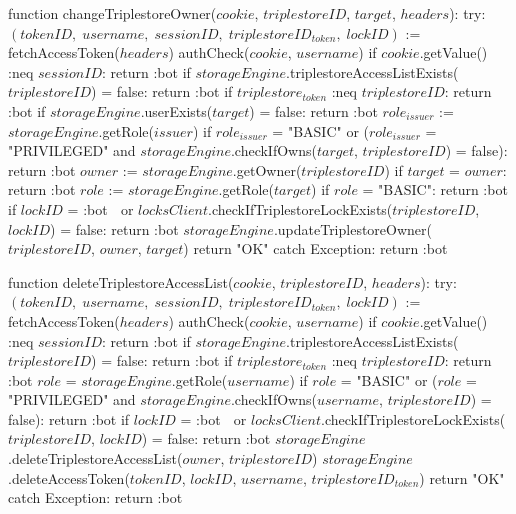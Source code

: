 function changeTriplestoreOwner($cookie$, $triplestoreID$, $target$, $headers$):
    try:
        $(tokenID, \; username, \; sessionID, \; triplestoreID_{token}, \; lockID)$ := fetchAccessToken($headers$)
        authCheck($cookie$, $username$)
        if $cookie$.getValue() :neq $sessionID$: 
            return :bot
        if $storageEngine$.triplestoreAccessListExists($triplestoreID$) = false:
            return :bot
        if $triplestore_{token}$ :neq $triplestoreID$:
            return :bot
        if $storageEngine$.userExists($target$) = false:
            return :bot
        $role_{issuer}$ := $storageEngine$.getRole($issuer$)
        if $role_{issuer}$ = "BASIC" or ($role_{issuer}$ = "PRIVILEGED" and $storageEngine$.checkIfOwns($target$, $triplestoreID$) = false):
            return :bot
        $owner$ := $storageEngine$.getOwner($triplestoreID$)
        if $target$ = $owner$:
            return :bot
        $role$ := $storageEngine$.getRole($target$)
        if $role$ = "BASIC":
            return :bot
        if $lockID$ = :bot $\;$ or $locksClient$.checkIfTriplestoreLockExists($triplestoreID$, $lockID$) = false:
            return :bot
        $storageEngine$.updateTriplestoreOwner($triplestoreID$, $owner$, $target$)
        return "OK"
    catch Exception: 
       return :bot

function deleteTriplestoreAccessList($cookie$, $triplestoreID$, $headers$):
    try:
        $(tokenID, \; username, \; sessionID, \; triplestoreID_{token}, \; lockID)$ := fetchAccessToken($headers$)
        authCheck($cookie$, $username$)
        if $cookie$.getValue() :neq $sessionID$: 
            return :bot
        if $storageEngine$.triplestoreAccessListExists($triplestoreID$) = false:
            return :bot
        if $triplestore_{token}$ :neq $triplestoreID$:
            return :bot
        $role$ = $storageEngine$.getRole($username$)
        if $role$ = "BASIC" or ($role$ = "PRIVILEGED" and $storageEngine$.checkIfOwns($username$, $triplestoreID$) = false):
            return :bot
        if $lockID$ = :bot $\;$ or $locksClient$.checkIfTriplestoreLockExists($triplestoreID$, $lockID$) = false:
            return :bot
        $storageEngine$.deleteTriplestoreAccessList($owner$, $triplestoreID$)
        $storageEngine$.deleteAccessToken($tokenID$, $lockID$, $username$, $triplestoreID_{token}$)
        return "OK"
    catch Exception: 
       return :bot

